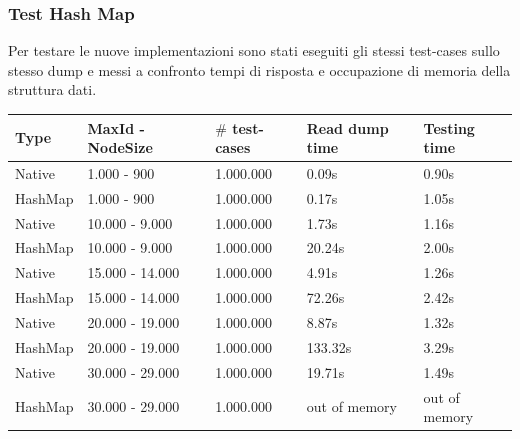 \subsubsection{Test Hash Map}
Per testare le nuove implementazioni sono stati eseguiti gli stessi test-cases sullo stesso dump e messi a confronto tempi di risposta e occupazione di memoria della struttura dati.\\

\begin{tabular}{|l|l|l|l|l|}
    \hline
    \textbf{Type}    &   \textbf{MaxId - NodeSize}   &   \textbf{$\#$ test-cases}   &   \textbf{Read dump time}  &   \textbf{Testing time}            \\      
    \hline
    Native              &   1.000 - 900              &   1.000.000                  &   0.09s               &   0.90s                       \\
    HashMap             &   1.000 - 900              &   1.000.000                  &   0.17s               &   1.05s                       \\         
    \hline
    Native              &   10.000 - 9.000           &   1.000.000                  &   1.73s               &   1.16s                       \\
    HashMap             &   10.000 - 9.000           &   1.000.000                  &   20.24s              &   2.00s                       \\ 
    \hline
    Native              &   15.000 - 14.000          &   1.000.000                  &   4.91s               &   1.26s                       \\
    HashMap             &   15.000 - 14.000          &   1.000.000                  &   72.26s              &   2.42s                       \\ 
    \hline
    Native              &   20.000 - 19.000          &   1.000.000                  &   8.87s               &   1.32s                       \\
    HashMap             &   20.000 - 19.000          &   1.000.000                  &   133.32s             &   3.29s                       \\ 
    \hline
    Native              &   30.000 - 29.000          &   1.000.000                  &   19.71s              &   1.49s                       \\
    HashMap             &   30.000 - 29.000          &   1.000.000                  &   out of memory       &   out of memory               \\
    \hline                                    
\end{tabular}\\

